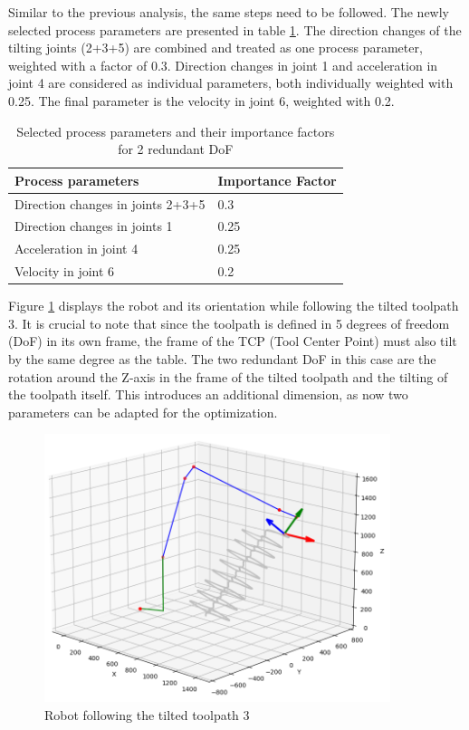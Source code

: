 Similar to the previous analysis, the same steps need to be followed. The newly selected process parameters are presented in table \ref{PP_2}. The direction changes of the tilting joints (2+3+5) are combined and treated as one process parameter, weighted with a factor of 0.3. Direction changes in joint 1 and acceleration in joint 4 are considered as individual parameters, both individually weighted with 0.25. The final parameter is the velocity in joint 6, weighted with 0.2.

\begin{table}[H]
	\centering
	\begin{tabular}{||l|l||}
		Process parameters& Importance Factor \\
		\hline
		\hline
		\hline
		Direction changes in joints 2+3+5	&		0.3 \\
		Direction changes in joints 1	&  	0.25 \\
		Acceleration in joint 4	& 		0.25\\
		Velocity in joint 6	& 		0.2\\
		\hline
		\hline
	\end{tabular}
	
	\caption{Selected process parameters and their importance factors for 2 redundant DoF}
	\label{PP_2}
\end{table}


Figure \ref{TP3_25_robot} displays the robot and its orientation while following the tilted toolpath 3. It is crucial to note that since the toolpath is defined in 5 degrees of freedom (DoF) in its own frame, the frame of the TCP (Tool Center Point) must also tilt by the same degree as the table. The two redundant DoF in this case are the rotation around the Z-axis in the frame of the tilted toolpath and the tilting of the toolpath itself. This introduces an additional dimension, as now two parameters can be adapted for the optimization.


\begin{figure}[H]
	\centerline{\includegraphics[width=0.9\textwidth]{figures/robotANDpath3_45.png}}
	\caption{Robot following the tilted toolpath 3}
	\label{TP3_25_robot}
\end{figure}

